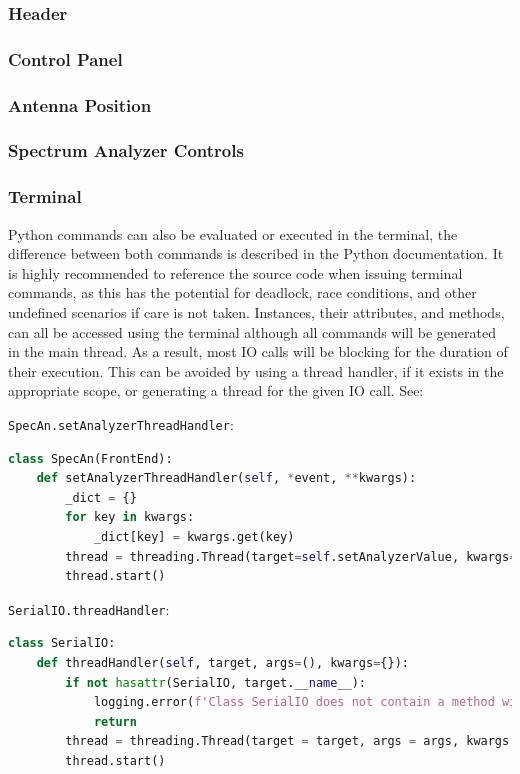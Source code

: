 \documentclass[titlepage]{article}
\begin{document}
\subsubsection{Header}
\subsubsection{Control Panel}
\subsubsection{Antenna Position}
\subsubsection{Spectrum Analyzer Controls}
\subsubsection{Terminal}
Python commands can also be evaluated or executed in the terminal, the difference between both commands is described in the Python documentation. It is highly recommended to reference the source code when issuing terminal commands, as this has the potential for deadlock, race conditions, and other undefined scenarios if care is not taken. Instances, their attributes, and methods, can all be accessed using the terminal although all commands will be generated in the main thread. As a result, most IO calls will be blocking for the duration of their execution. This can be avoided by using a thread handler, if it exists in the appropriate scope, or generating a thread for the given IO call. See:

\verb|SpecAn.setAnalyzerThreadHandler|:
\begin{lstlisting}[language=Python]
class SpecAn(FrontEnd):
    def setAnalyzerThreadHandler(self, *event, **kwargs):
        _dict = {}
        for key in kwargs:
            _dict[key] = kwargs.get(key)
        thread = threading.Thread(target=self.setAnalyzerValue, kwargs=_dict)
        thread.start()
\end{lstlisting}

\verb|SerialIO.threadHandler|:
\begin{lstlisting}[language=Python]
class SerialIO:
    def threadHandler(self, target, args=(), kwargs={}):
        if not hasattr(SerialIO, target.__name__):
            logging.error(f'Class SerialIO does not contain a method with identifier {target.__name__}')
            return
        thread = threading.Thread(target = target, args = args, kwargs = kwargs, daemon=True)
        thread.start()
\end{lstlisting}
\end{document}

